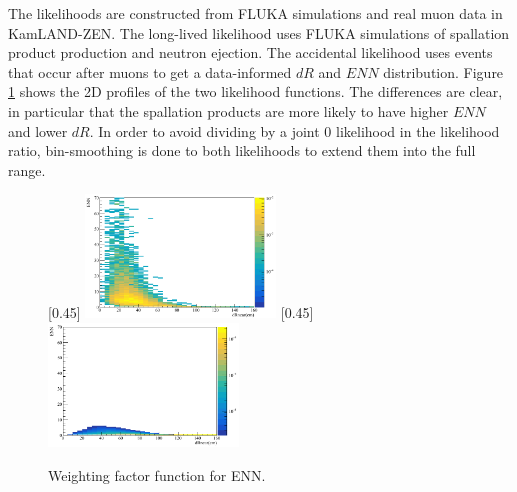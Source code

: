 The likelihoods are constructed from FLUKA simulations and real muon data in KamLAND-ZEN. The long-lived likelihood uses FLUKA simulations of spallation product production and neutron ejection. The accidental likelihood uses events that occur after muons to get a data-informed $dR$ and $ENN$ distribution. Figure \ref{fig:likelihood_dR_ENN} shows the 2D profiles of the two likelihood functions. The differences are clear, in particular that the spallation products are more likely to have higher $ENN$ and lower $dR$. In order to avoid dividing by a joint 0 likelihood in the likelihood ratio, bin-smoothing is done to both likelihoods to extend them into the full range.

\begin{figure}[htbp]
	\centering
	[0.45\textwidth]{
		\includegraphics[width=0.45\textwidth]{spall_dR_ENN.png}}
	\hfill
	[0.45\textwidth]{
		\includegraphics[width=0.45\textwidth]{acc_dR_ENN.png}}
	\caption{Weighting factor function for ENN.}
	\label{fig:likelihood_dR_ENN}
\end{figure}

